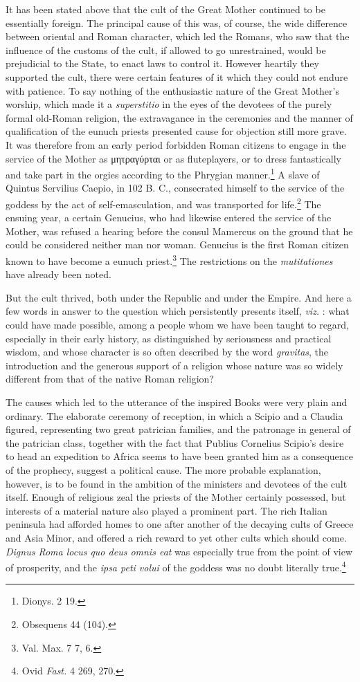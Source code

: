 \documentclass[a4paper, 11pt, oneside, polutonikogreek, english]{article}
\begin{document}
It has been stated above that the cult of the Great Mother continued to be essentially foreign. The principal cause of this was, of course, the wide difference between oriental and Roman character, which led the Romans, who saw that the influence of the customs of the cult, if allowed to go unrestrained, would be prejudicial to the State, to enact laws to control it. However heartily they supported the cult, there were certain features of it which they could not endure with patience. To say nothing of the enthusiastic nature of the Great Mother's worship, which made it a \emph{superstitio} in the eyes of the devotees of the purely formal old-Roman religion, the extravagance in the ceremonies and the manner of qualification of the eunuch priests presented cause for objection still more grave. It was therefore from an early period forbidden Roman citizens to engage in the service of the Mother as μητραγύρται or as fluteplayers, or to dress fantastically and take part in the orgies according to the Phrygian manner.\footnote{Dionys. 2 19.} A slave of Quintus Servilius Caepio, in 102 B. C., consecrated himself to the service of the goddess by the act of self-emasculation, and was transported for life.\footnote{Obsequens 44 (104).} The ensuing year, a certain Genucius, who had likewise entered the service of the Mother, was refused a hearing before the consul Mamercus on the ground that he could be considered neither man nor woman. Genucius is the first Roman citizen known to have become a eunuch priest.\footnote{Val. Max. 7 7, 6.} The restrictions on the \emph{mutitationes} have already been noted.

But the cult thrived, both under the Republic and under the Empire. And here a few words in answer to the question which persistently presents itself, \emph{viz.} : what could have made possible, among a people whom we have been taught to regard, especially in their early history, as distinguished by seriousness and practical wisdom, and whose character is so often described by the word \emph{gravitas}, the introduction and the generous support of a religion whose nature was so widely different from that of the native Roman religion?

The causes which led to the utterance of the inspired Books were very plain and ordinary. The elaborate ceremony of reception, in which a Scipio and a Claudia figured, representing two great patrician families, and the patronage in general of the patrician class, together with the fact that Publius Cornelius Scipio's desire to head an expedition to Africa seems to have been granted him as a consequence of the prophecy, suggest a political cause. The more probable explanation, however, is to be found in the ambition of the ministers and devotees of the cult itself. Enough of religious zeal the priests of the Mother certainly possessed, but interests of a material nature also played a prominent part. The rich Italian peninsula had afforded homes to one after another of the decaying cults of Greece and Asia Minor, and offered a rich reward to yet other cults which should come. \emph{Dignus Roma locus quo deus omnis eat} was especially true from the point of view of prosperity, and the \emph{ipsa peti volui} of the goddess was no doubt literally true.\footnote{Ovid \emph{Fast.} 4 269, 270.}
\end{document}
